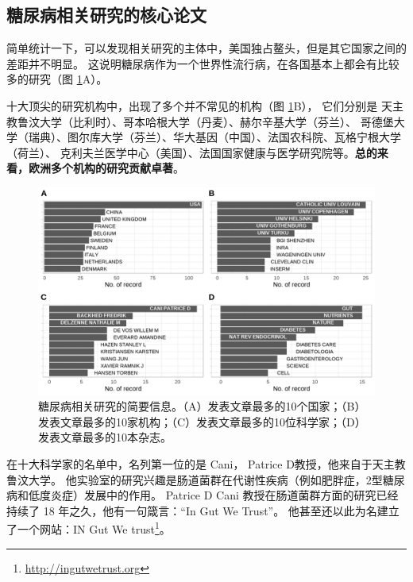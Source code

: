 \documentclass[]{ctexbook}
\renewcommand{\href}[2]{#2\footnote{\url{#1}}}
\begin{document}
\hypertarget{ux7cd6ux5c3fux75c5ux76f8ux5173ux7814ux7a76ux7684ux6838ux5fc3ux8bbaux6587}{%
\subsection{糖尿病相关研究的核心论文}\label{ux7cd6ux5c3fux75c5ux76f8ux5173ux7814ux7a76ux7684ux6838ux5fc3ux8bbaux6587}}

\hypertarget{htmlwidget-4b38b1adece26119db66}{}

简单统计一下，可以发现相关研究的主体中，美国独占鳌头，但是其它国家之间的差距并不明显。
这说明糖尿病作为一个世界性流行病，在各国基本上都会有比较多的研究（图 \ref{fig:diabetes-four-dimension-barplot}A）。

十大顶尖的研究机构中，出现了多个并不常见的机构（图 \ref{fig:diabetes-four-dimension-barplot}B），
它们分别是 天主教鲁汶大学（比利时）、哥本哈根大学（丹麦）、赫尔辛基大学（芬兰）、
哥德堡大学（瑞典）、图尔库大学（芬兰）、华大基因（中国）、法国农科院、瓦格宁根大学（荷兰）、
克利夫兰医学中心（美国）、法国国家健康与医学研究院等。\textbf{总的来看，欧洲多个机构的研究贡献卓著}。

\begin{figure}
\includegraphics[width=1\linewidth]{plots/diabetes-four-dimension-barplot-1} \caption{糖尿病相关研究的简要信息。（A）发表文章最多的10个国家；（B）发表文章最多的10家机构；（C）发表文章最多的10位科学家；（D）发表文章最多的10本杂志。}\label{fig:diabetes-four-dimension-barplot}
\end{figure}

在十大科学家的名单中，名列第一位的是 Cani， Patrice D教授，他来自于天主教鲁汶大学。
他实验室的研究兴趣是肠道菌群在代谢性疾病（例如肥胖症，2型糖尿病和低度炎症）发展中的作用。
Patrice D Cani 教授在肠道菌群方面的研究已经持续了 18 年之久，他有一句箴言：``In Gut We Trust''。
他甚至还以此为名建立了一个网站：\href{http://ingutwetrust.org}{IN Gut We trust}。
\end{document}

